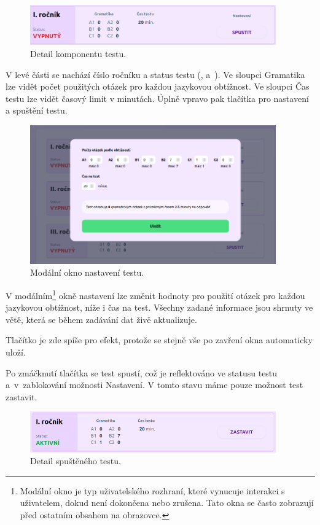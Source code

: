 \begin{figure}[H]
    \centering
    \includegraphics[width=400px]{images/01design/test.png}
    \caption{Detail komponentu testu.}
\end{figure}

V levé části se nachází číslo ročníku a status testu (,  a~). Ve sloupci Gramatika lze vidět počet použitých otázek pro každou jazykovou obtížnost. Ve sloupci Čas testu lze vidět časový limit v minutách. Úplně vpravo pak tlačítka pro nastavení a spuštění testu.

\begin{figure}[H]
    \centering
    \includegraphics[width=400px]{images/01design/test-modal.png}
    \caption{Modální okno nastavení testu.}
\end{figure}

V modálním\footnote{Modální okno je typ uživatelského rozhraní, které vynucuje interakci s uživatelem, dokud není dokončena nebo zrušena. Tato okna se často zobrazují před ostatním obsahem na obrazovce.} okně nastavení lze změnit hodnoty pro použití otázek pro každou jazykovou obtížnost, níže i čas na test. Všechny zadané informace jsou shrnuty ve větě, která se během zadávání dat živě aktualizuje.

Tlačítko  je zde spíše pro efekt, protože se stejně vše po zavření okna automaticky uloží.

Po zmáčknutí tlačítka  se test spustí, což je reflektováno ve statusu testu a~v~zablokování možnosti Nastavení. V tomto stavu máme pouze možnost test zastavit.

\begin{figure}[H]
    \centering
    \includegraphics[width=400px]{images/01design/test-running.png}
    \caption{Detail spuštěného testu.}
\end{figure}

